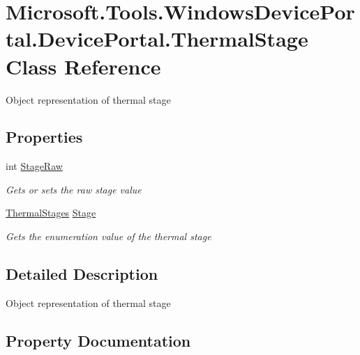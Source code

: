 \hypertarget{class_microsoft_1_1_tools_1_1_windows_device_portal_1_1_device_portal_1_1_thermal_stage}{}\section{Microsoft.\+Tools.\+Windows\+Device\+Portal.\+Device\+Portal.\+Thermal\+Stage Class Reference}
\label{class_microsoft_1_1_tools_1_1_windows_device_portal_1_1_device_portal_1_1_thermal_stage}


Object representation of thermal stage  


\subsection*{Properties}
\begin{DoxyCompactItemize}
\item 
int \hyperlink{class_microsoft_1_1_tools_1_1_windows_device_portal_1_1_device_portal_1_1_thermal_stage_a91f53f3b50fa9e36fed48aa6c6843b84}{Stage\+Raw}
\begin{DoxyCompactList}\small\item\em Gets or sets the raw stage value \end{DoxyCompactList}\item 
\hyperlink{namespace_microsoft_1_1_tools_1_1_windows_device_portal_aba1cf1ca5947296337c5aedd4fa37bf4}{Thermal\+Stages} \hyperlink{class_microsoft_1_1_tools_1_1_windows_device_portal_1_1_device_portal_1_1_thermal_stage_a4af4bafc8260dc09236c3a042bc32153}{Stage}
\begin{DoxyCompactList}\small\item\em Gets the enumeration value of the thermal stage \end{DoxyCompactList}\end{DoxyCompactItemize}


\subsection{Detailed Description}
Object representation of thermal stage 



\subsection{Property Documentation}

